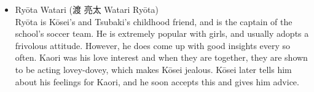\documentclass[a4paper,10pt]{article}
\begin{document}
\begin{CJK}{UTF8}{min}
\begin{itemize}
\item{Ryōta Watari (渡 亮太 Watari Ryōta)}\\
Ryōta is Kōsei's and Tsubaki's childhood friend, and is the captain of the school's soccer team. He is extremely popular with girls, and usually adopts a frivolous attitude. However, he does come up with good insights every so often. Kaori was his love interest and when they are together, they are shown to be acting lovey-dovey, which makes Kōsei jealous. Kōsei later tells him about his feelings for Kaori, and he soon accepts this and gives him advice.  
\end{itemize}

\end{CJK}
\end{document}
